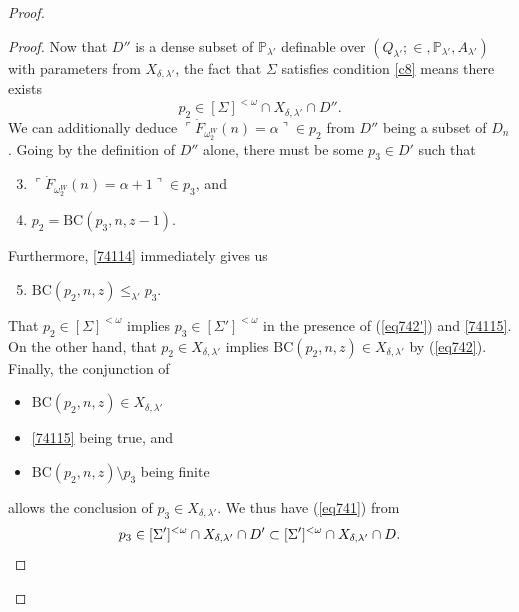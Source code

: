 \documentclass[12pt, twoside]{memoir}
\numberwithin{equation}{section}
\theoremstyle{definition}
\theoremstyle{remark}
\theoremstyle{definition}
\theoremstyle{definition}
\theoremstyle{definition}
\theoremstyle{remark}
\begin{document}
\begin{proof}
\begin{proof}
Now that $D''$ is a dense subset of $\mathbb{P}_{\lambda'}$ definable over $(Q_{\lambda'}; \in, \mathbb{P}_{\lambda'}, A_{\lambda'})$ with parameters from $X_{\delta, \lambda'}$, the fact that $\Sigma$ satisfies condition \ref{c8} means there exists
\begin{equation*}
    p_2 \in [\Sigma]^{< \omega} \cap X_{\delta, \lambda'} \cap D'' \text{.}
\end{equation*}
We can additionally deduce $\ulcorner \dot{F}_{\omega_2^W}(n) = \alpha \urcorner \in p_2$ from $D''$ being a subset of $D_n$. Going by the definition of $D''$ alone, there must be some $p_3 \in D'$ such that 
\begin{enumerate}[label=(\arabic*)]
    \setcounter{enumi}{2}
    \item\label{74113} $\ulcorner \dot{F}_{\omega_2^W}(n) = \alpha + 1 \urcorner \in p_3$, and
    \item\label{74114} $p_2 = \mathrm{BC}(p_3, n, z-1)$.
\end{enumerate}
Furthermore, \ref{74114} immediately gives us
\begin{enumerate}[label=(\arabic*)]
    \setcounter{enumi}{4}
    \item\label{74115} $\mathrm{BC}(p_2, n, z) \leq_{\lambda'} p_3$.
\end{enumerate}
That $p_2 \in [\Sigma]^{< \omega}$ implies $p_3 \in [\Sigma']^{< \omega}$ in the presence of (\ref{eq742'}) and \ref{74115}. On the other hand, that $p_2 \in X_{\delta, \lambda'}$ implies $\mathrm{BC}(p_2, n, z) \in X_{\delta, \lambda'}$ by (\ref{eq742}). Finally, the conjunction of 
\begin{itemize}
    \item $\mathrm{BC}(p_2, n, z) \in X_{\delta, \lambda'}$
    \item \ref{74115} being true, and
    \item $\mathrm{BC}(p_2, n, z) \setminus p_3$ being finite
\end{itemize}
allows the conclusion of $p_3 \in X_{\delta, \lambda'}$. We thus have (\ref{eq741}) from
\begin{equation*}
    p_3 \in [\Sigma']^{< \omega} \cap X_{\delta, \lambda'} \cap D' \subset [\Sigma']^{< \omega} \cap X_{\delta, \lambda'} \cap D. \qedhere
\end{equation*}
\end{proof}


\end{proof}
\end{document}
